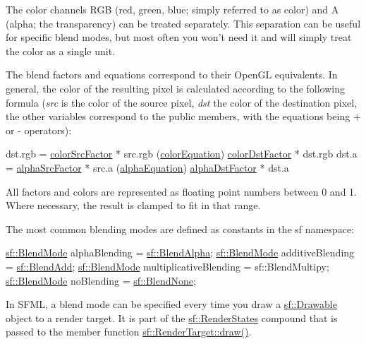 The color channels R\-G\-B (red, green, blue; simply referred to as color) and A (alpha; the transparency) can be treated separately. This separation can be useful for specific blend modes, but most often you won't need it and will simply treat the color as a single unit.

The blend factors and equations correspond to their Open\-G\-L equivalents. In general, the color of the resulting pixel is calculated according to the following formula ({\itshape src} is the color of the source pixel, {\itshape dst} the color of the destination pixel, the other variables correspond to the public members, with the equations being + or -\/ operators)\-: 
\begin{DoxyCode}
dst.rgb = \hyperlink{structsf_1_1_blend_mode_a32d1a55dbfada86a06d9b881dc8ccf7b}{colorSrcFactor} * src.rgb (\hyperlink{structsf_1_1_blend_mode_aed12f06eb7f50a1b95b892b0964857b1}{colorEquation}) 
      \hyperlink{structsf_1_1_blend_mode_adee68ee59e7f1bf71d12db03d251104d}{colorDstFactor} * dst.rgb
dst.a   = \hyperlink{structsf_1_1_blend_mode_aa94e44f8e1042a7357e8eff78c61a1be}{alphaSrcFactor} * src.a   (\hyperlink{structsf_1_1_blend_mode_a68f5a305e0912946f39ba6c9265710c4}{alphaEquation}) 
      \hyperlink{structsf_1_1_blend_mode_aaf85b6b7943181cc81745569c4851e4e}{alphaDstFactor} * dst.a
\end{DoxyCode}
 All factors and colors are represented as floating point numbers between 0 and 1. Where necessary, the result is clamped to fit in that range.

The most common blending modes are defined as constants in the sf namespace\-:


\begin{DoxyCode}
\hyperlink{structsf_1_1_blend_mode}{sf::BlendMode} alphaBlending          = \hyperlink{namespacesf_a7747d95d2e1f108142ea7c760c0b266c}{sf::BlendAlpha};
\hyperlink{structsf_1_1_blend_mode}{sf::BlendMode} additiveBlending       = \hyperlink{namespacesf_a1be8c314242e6ed161af2aea08be543c}{sf::BlendAdd};
\hyperlink{structsf_1_1_blend_mode}{sf::BlendMode} multiplicativeBlending = sf::BlendMultipy;
\hyperlink{structsf_1_1_blend_mode}{sf::BlendMode} noBlending             = \hyperlink{namespacesf_aaa5511bd6fcf3573d61945b6d70a20ab}{sf::BlendNone};
\end{DoxyCode}


In S\-F\-M\-L, a blend mode can be specified every time you draw a \hyperlink{classsf_1_1_drawable}{sf\-::\-Drawable} object to a render target. It is part of the \hyperlink{classsf_1_1_render_states}{sf\-::\-Render\-States} compound that is passed to the member function \hyperlink{classsf_1_1_render_target_a12417a3bcc245c41d957b29583556f39}{sf\-::\-Render\-Target\-::draw()}.

